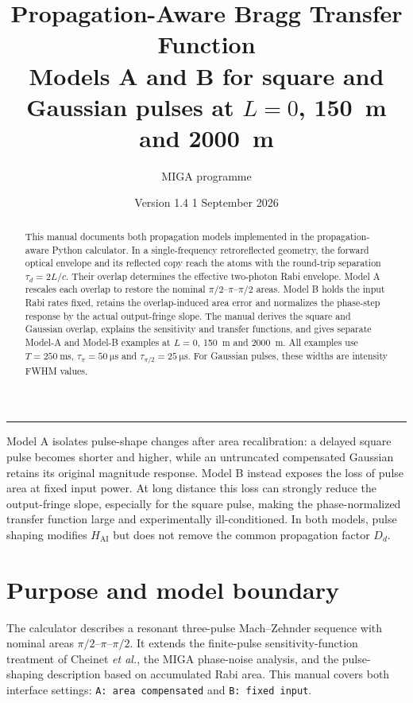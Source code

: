 \documentclass[11pt,a4paper]{article}
\title{\vspace{-1.3cm}\textbf{Propagation-Aware Bragg Transfer Function}\\[0.35em]
\large Models A and B for square and Gaussian pulses at $L=0$, \SI{150}{\metre} and \SI{2000}{\metre}}
\author{MIGA programme}
\date{Version 1.4 \textbullet{} 1 September 2026}
\newcommand{\Hatom}{H_{\mathrm{AI}}}
\newcommand{\taud}{\tau_{d}}
\begin{document}
\maketitle
\begin{center}\rule{0.92\textwidth}{0.6pt}\end{center}

\begin{abstract}
This manual documents both propagation models implemented in the propagation-aware Python calculator. In a single-frequency retroreflected geometry, the forward optical envelope and its reflected copy reach the atoms with the round-trip separation $\taud=2L/c$. Their overlap determines the effective two-photon Rabi envelope. Model A rescales each overlap to restore the nominal $\pi/2$--$\pi$--$\pi/2$ areas. Model B holds the input Rabi rates fixed, retains the overlap-induced area error and normalizes the phase-step response by the actual output-fringe slope. The manual derives the square and Gaussian overlap, explains the sensitivity and transfer functions, and gives separate Model-A and Model-B examples at $L=0$, \SI{150}{\metre} and \SI{2000}{\metre}. All examples use $T=\SI{250}{\milli\second}$, $\tau_{\pi}=\SI{50}{\micro\second}$ and $\tau_{\pi/2}=\SI{25}{\micro\second}$. For Gaussian pulses, these widths are intensity FWHM values.
\end{abstract}

\begin{keybox}
Model A isolates pulse-shape changes after area recalibration: a delayed square pulse becomes shorter and higher, while an untruncated compensated Gaussian retains its original magnitude response. Model B instead exposes the loss of pulse area at fixed input power. At long distance this loss can strongly reduce the output-fringe slope, especially for the square pulse, making the phase-normalized transfer function large and experimentally ill-conditioned. In both models, pulse shaping modifies $\Hatom$ but does not remove the common propagation factor $D_d$.
\end{keybox}

\tableofcontents
\clearpage

\section{Purpose and model boundary}

The calculator describes a resonant three-pulse Mach--Zehnder sequence with nominal areas $\pi/2$--$\pi$--$\pi/2$. It extends the finite-pulse sensitivity-function treatment of Cheinet \textit{et al.}\cite{Cheinet2008}, the MIGA phase-noise analysis\cite{Canuel2018}, and the pulse-shaping description based on accumulated Rabi area\cite{Fang2018}. This manual covers both interface settings: \texttt{A: area compensated} and \texttt{B: fixed input}.
\end{document}
